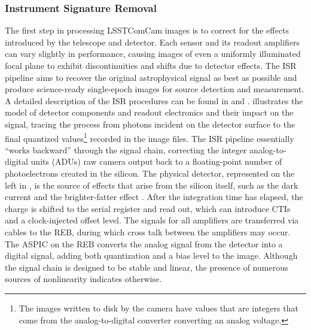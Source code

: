 \subsubsection{Instrument Signature Removal}
\label{ssec:isr}
The first step in processing \gls{LSSTComCam} images is to correct for the effects introduced by the telescope and detector.
Each sensor and its readout amplifiers can vary slightly in performance, causing images of even a uniformly illuminated focal plane to exhibit discontinuities and shifts due to detector effects.
The \gls{ISR} pipeline aims to recover the original astrophysical signal as best as possible and produce science-ready single-epoch images for source detection and measurement.
A detailed description of the \gls{ISR} procedures can be found in \citet{SITCOMTN-086} and \citet{2025JATIS..11a1209P}.
 illustrates the model of detector components and readout electronics and their impact on the signal, tracing the process from photons incident on the detector surface to the final quantized values\footnote{The images written to disk by the camera have values that are integers that come from the analog-to-digital converter converting an analog voltage.} recorded in the image files.
The \gls{ISR} \gls{pipeline} essentially ``works backward'' through the signal chain, correcting the integer analog-to-digital units (ADUs) raw camera output back to a floating-point number of photoelectrons created in the silicon.
The physical detector, represented on the left in  , is the source of effects that arise from the silicon itself, such as the dark current and the brighter-fatter effect \citep[][]{2018PASP..130f5004P,2024PASP..136d5003B}.
After the integration time has elapsed, the charge is shifted  to the serial register and read out, which can introduce \gls{CTI}s and a clock-injected offset level.
The signals for all amplifiers are transferred via cables to the \gls{REB}, during which cross talk between the amplifiers may occur.
The \gls{ASPIC} on the \gls{REB} converts the analog signal from the detector into a digital signal, adding both quantization and a bias level to the image.
Although the signal chain is designed to be stable and linear, the presence of numerous sources of nonlinearity indicates otherwise.

